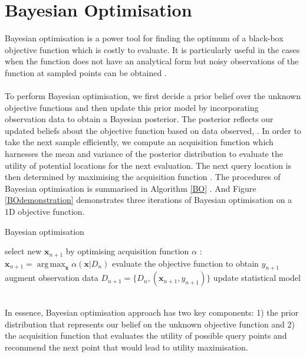 \documentclass[a4paper,11pt]{report}
\DeclareMathOperator*{\argmax}{arg\,max}
\begin{document}
\section{Bayesian Optimisation}
Bayesian optimisation is a power tool for finding the optimum of a black-box objective function which is costly to evaluate. It is particularly useful in the cases when the function does not have an analytical form but noisy observations of the function at sampled points can be obtained \cite{brochu2010tutorial}.  
\\\\
To perform Bayesian optimisation, we first decide a prior belief over the unknown objective functions and then update this prior model by incorporating observation data to obtain a Bayesian posterior. The posterior reflects our updated beliefs about the objective function based on data observed, . In order to take the next sample efficiently, we compute an acquisition function which harnesses the mean and variance of the posterior distribution to evaluate the utility of potential locations for the next evaluation. The next query location is then determined by maximising the acquisition function \cite{shahriari2016taking}. The procedures of Bayesian optimisation is summarised in Algorithm \ref{BO} \cite{brochu2010tutorial}. And Figure \ref{BOdemonstration} demonstrates three iterations of Bayesian optimisation on a 1D objective function. 
\\
\begin{algorithm}
\caption{Bayesian optimisation }\label{BO}
\begin{algorithmic}[1]
\Statex
	\State select new $\mathbf{x}_{n+1}$ by optimising acquisition function $\alpha$ :   $\mathbf{x}_{n+1}=\argmax_{\mathbf{x}} \alpha(\mathbf{x} \vert D_n ) $
	\State evaluate the objective function to obtain $y_{n+1}$
	\State augment observation data $D_{n+1} = \{ D_n, (\mathbf{x}_{n+1} , y_{n+1}) \} $
	\State update statistical model 
	\EndFor
\end{algorithmic}
\end{algorithm}
\\
\noindent
In essence, Bayesian optimisation approach has two key components: 1) the prior distribution that represents our belief on the unknown objective function and 2) the acquisition function that evaluates the utility of possible query points and recommend the next point that would lead to utility maximisation.   
\\
\end{document}
